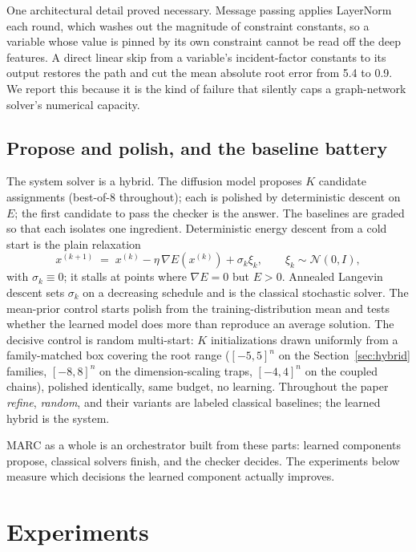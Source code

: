 \documentclass[11pt]{article}
\begin{document}
One architectural detail proved necessary. Message passing applies LayerNorm each round, which
washes out the magnitude of constraint constants, so a variable whose value is pinned by its
own constraint cannot be read off the deep features. A direct linear skip from a variable's
incident-factor constants to its output restores the path and cut the mean absolute root error
from 5.4 to 0.9. We report this because it is the kind of failure that silently caps a
graph-network solver's numerical capacity.

\subsection{Propose and polish, and the baseline battery}

The system solver is a hybrid. The diffusion model proposes $K$ candidate assignments
(best-of-8 throughout); each is polished by deterministic descent on $E$; the first candidate
to pass the checker is the answer. The baselines are graded so that each isolates one
ingredient. Deterministic energy descent from a cold start is the plain relaxation
\begin{equation}
x^{(k+1)} \;=\; x^{(k)} - \eta \, \nabla E\!\left(x^{(k)}\right) + \sigma_k \xi_k,
\qquad \xi_k \sim \mathcal{N}(0, I),
\end{equation}
with $\sigma_k \equiv 0$; it stalls at points where $\nabla E = 0$ but $E > 0$. Annealed
Langevin descent sets $\sigma_k$ on a decreasing schedule and is the classical stochastic
solver. The mean-prior control starts polish from the training-distribution mean and tests
whether the learned model does more than reproduce an average solution. The decisive control
is random multi-start: $K$ initializations drawn uniformly from a family-matched box covering
the root range ($[-5,5]^n$ on the Section~\ref{sec:hybrid} families, $[-8,8]^n$ on the
dimension-scaling traps, $[-4,4]^n$ on the coupled chains), polished identically, same budget,
no learning. Throughout the paper \emph{refine}, \emph{random}, and
their variants are labeled classical baselines; the learned hybrid is the system.

MARC as a whole is an orchestrator built from these parts: learned components propose,
classical solvers finish, and the checker decides. The experiments below measure which
decisions the learned component actually improves.

\section{Experiments}
\label{sec:experiments}
\end{document}
